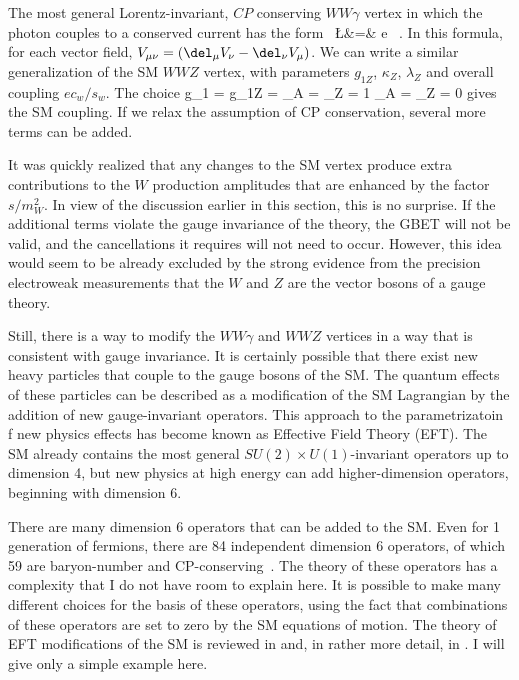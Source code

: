 \documentclass[12pt]{article}
\begin{document}
The most general  Lorentz-invariant, $CP$ conserving $WW\gamma$ vertex
in which the photon couples to a conserved current 
has the form~\cite{Hagiwara}
\beqa
\Delta\L &=& e  \ .
\eeqan
In this formula, for each vector field, $V_{\mu\nu} = (\del_\mu V_\nu
- \del_\nu V_\mu)$.  We can write a similar generalization of the SM
$WWZ$ vertex, with parameters $g_{1Z}$, $\kappa_Z$, $\lambda_Z$ and
overall coupling $e c_w/s_w$.   The
choice
\beq
     g_{1\gamma} = g_{1Z} = \kappa_A = \kappa_Z = 1 \qquad \lambda_A =
     \lambda_Z = 0 
gives the SM coupling.  If we relax the assumption of CP conservation,
several more terms can be added. 

It was quickly realized that any changes to the SM vertex produce
extra contributions to the $W$ production amplitudes that are enhanced
by the factor $s/m_W^2$.   In view of the discussion earlier in this
section, this is no surprise.   If the  additional terms violate the
gauge invariance of the theory, the GBET will not be valid, and the
cancellations it requires will not need to occur.  However, this idea
would seem to be already excluded by the strong evidence from the
precision electroweak measurements that the $W$ and $Z$ are the vector
bosons of a gauge theory.

Still, there is a way to modify the $WW\gamma$ and $WWZ$ vertices in a
way that is consistent with gauge invariance.   It is certainly
possible that there exist new heavy particles that couple to the gauge
bosons of the SM.  The quantum effects of these particles can be
described as a modification of 
the SM Lagrangian by the addition of new gauge-invariant operators.
This approach to the parametrizatoin f new physics effects has become
known as Effective Field Theory (EFT). 
The SM already contains the most general $SU(2)\times U(1)$-invariant
operators up to dimension 4, but new physics at high energy can add
higher-dimension operators, beginning with dimension 6. 

There are many dimension 6 operators that can be added to the SM.
Even for 1 generation of fermions, there are 84 independent dimension
6 operators, of which 59 are baryon-number and
CP-conserving~\cite{Warsaw}.
The theory of these operators has a complexity that I do
not have room to explain here.   It is possible to make many different
choices for the basis of these operators, using the fact that 
combinations of these operators are set to zero by the SM equations of
motion.  The theory of EFT modifications of the SM is reviewed
in \cite{dimsixreview} and, in rather more detail, in
\cite{Murayama}.  I will give only a simple example here.
\end{document}
